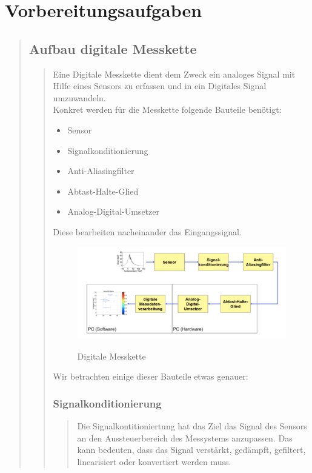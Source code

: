 \section{Vorbereitungsaufgaben}
\begin{quote}
	\subsection{Aufbau digitale Messkette}
    \begin{quote}
        Eine Digitale Messkette dient dem Zweck ein analoges Signal mit Hilfe eines Sensors zu erfassen und in ein
        Digitales Signal umzuwandeln.\\
        Konkret werden für die Messkette folgende Bauteile benötigt:
        \begin{itemize}
          \item Sensor
          \item Signalkonditionierung
          \item Anti-Aliasingfilter
          \item Abtast-Halte-Glied
          \item Analog-Digital-Umsetzer
        \end{itemize}
        Diese bearbeiten nacheinander das Eingangssignal.
        \begin{figure}[H]
			\centering
				\includegraphics[scale=0.5]{DigitaleMesskette}
				   \caption{Digitale Messkette}
		\cite{DigitaleMesskette}
		\end{figure}
		\vspace{1em}
	 	
	 	Wir betrachten einige dieser Bauteile etwas genauer:
	 	\subsubsection{Signalkonditionierung}
		\begin{quote}
			Die Signalkontitioniertung hat das Ziel das Signal des Sensors an den Aussteuerbereich des Messystems anzupassen. Das
			kann bedeuten, dass das Signal verstärkt, gedämpft, gefiltert, linearisiert oder konvertiert werden muss. 
		\end{quote}

\end{quote}
\end{quote}
